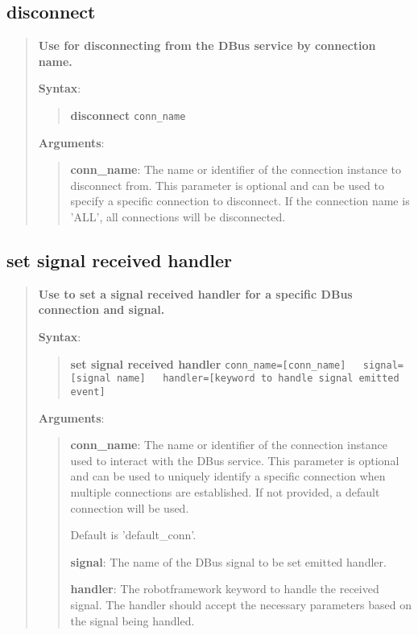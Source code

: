 \hypertarget{description-disconnect}{%
\subsection{\texorpdfstring{\textbf{disconnect}}{disconnect}}\label{description-disconnect}}

\begin{quote}
\textbf{Use for disconnecting from the DBus service by connection name.}

\textbf{Syntax}:

\begin{quote}
\textbf{disconnect} \texttt{conn\_name}
\end{quote}

\textbf{Arguments}:

\begin{quote}
\textbf{conn\_name}: The name or identifier of the connection instance to disconnect from.
This parameter is optional and can be used to specify a specific connection
to disconnect. If the connection name is 'ALL', all connections will be disconnected.
\end{quote}
\end{quote}

\hypertarget{description-set-signal-received-handler}{%
\subsection{\texorpdfstring{\textbf{set signal received handler}}{set signal received handler}}\label{description-set-signal-received-handler}}

\begin{quote}
\textbf{Use to set a signal received handler for a specific DBus connection and signal.}

\textbf{Syntax}:

\begin{quote}
\textbf{set signal received handler}
\texttt{conn\_name={[}conn\_name{]}\ \ \ signal={[}signal name{]}\ \ \ handler={[}keyword to handle signal emitted event{]}}
\end{quote}

\textbf{Arguments}:

\begin{quote}
\textbf{conn\_name}: The name or identifier of the connection instance used to interact with the DBus service.
  This parameter is optional and can be used to uniquely identify a specific connection
  when multiple connections are established. If not provided, a default connection will be used.

  Default is 'default\_conn'.

\vspace{\baselineskip}

\textbf{signal}: The name of the DBus signal to be set emitted handler.

\vspace{\baselineskip}

\textbf{handler}:  The robotframework keyword to handle the received signal.
  The handler should accept the necessary parameters based on the signal being handled.
\end{quote}
\end{quote}

